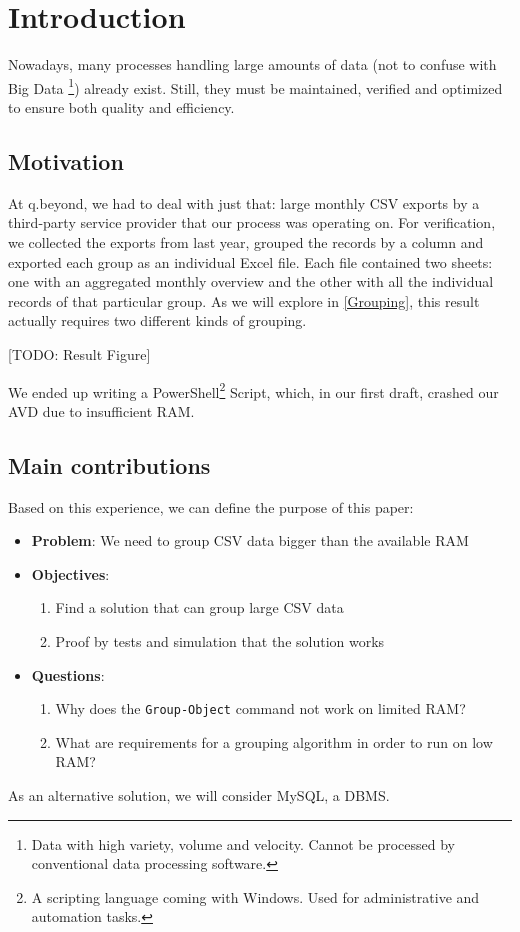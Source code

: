 \setcounter{page}{1}
\pagestyle{fancy}
\fancyhf{}
\fancyhead[R]{\thepage}
\renewcommand{\headrulewidth}{0pt} %

\section{Introduction}
Nowadays, many processes handling large amounts of data (not to confuse with Big Data
\footnote{Data with high variety, volume and velocity. Cannot be processed by conventional data processing software.})
already exist. Still, they must be maintained, verified and optimized to ensure both
quality and efficiency.

\subsection{Motivation}
At q.beyond, we had to deal with just that: large monthly CSV exports by a third-party service provider
that our process was operating on. For verification, we collected the exports from last year,
grouped the records by a column and exported each group as an individual Excel file.
Each file contained two sheets: one with an aggregated monthly overview and the other with all the
individual records of that particular group. As we will explore in \ref{Grouping}, this
result actually requires two different kinds of grouping.

[TODO: Result Figure]

We ended up writing a PowerShell\footnote{A scripting language coming with Windows. Used for administrative and automation tasks.}
Script, which, in our first draft, crashed our \gls{AVD}
due to insufficient \gls{RAM}.

\subsection{Main contributions}
Based on this experience, we can define the purpose of this paper:
\begin{itemize}
    \item \textbf{Problem}: We need to group CSV data bigger than the available RAM
    \item \textbf{Objectives}:
    \begin{enumerate}
        \item Find a solution that can group large CSV data
        \item Proof by tests and simulation that the solution works
    \end{enumerate}
    \item \textbf{Questions}:
    \begin{enumerate}
        \item Why does the \verb+Group-Object+ command not work on limited RAM?
        \item What are requirements for a grouping algorithm in order to run on low RAM?
    \end{enumerate}
\end{itemize}
As an alternative solution, we will consider MySQL, a \gls{DBMS}.

